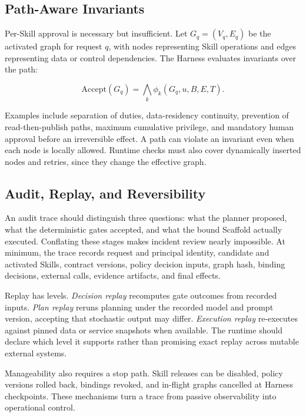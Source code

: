 \subsection{Path-Aware Invariants}

Per-Skill approval is necessary but insufficient. Let $G_q=(V_q,E_q)$ be the activated graph for request $q$, with nodes representing Skill operations and edges representing data or control dependencies. The Harness evaluates invariants over the path:

\begin{equation}
\mathrm{Accept}(G_q)=\bigwedge_k \phi_k(G_q,u,B,E,T).
\end{equation}

Examples include separation of duties, data-residency continuity, prevention of read-then-publish paths, maximum cumulative privilege, and mandatory human approval before an irreversible effect. A path can violate an invariant even when each node is locally allowed. Runtime checks must also cover dynamically inserted nodes and retries, since they change the effective graph.

\subsection{Audit, Replay, and Reversibility}

An audit trace should distinguish three questions: what the planner proposed, what the deterministic gates accepted, and what the bound Scaffold actually executed. Conflating these stages makes incident review nearly impossible. At minimum, the trace records request and principal identity, candidate and activated Skills, contract versions, policy decision inputs, graph hash, binding decisions, external calls, evidence artifacts, and final effects.

Replay has levels. \textit{Decision replay} recomputes gate outcomes from recorded inputs. \textit{Plan replay} reruns planning under the recorded model and prompt version, accepting that stochastic output may differ. \textit{Execution replay} re-executes against pinned data or service snapshots when available. The runtime should declare which level it supports rather than promising exact replay across mutable external systems.

Manageability also requires a stop path. Skill releases can be disabled, policy versions rolled back, bindings revoked, and in-flight graphs cancelled at Harness checkpoints. These mechanisms turn a trace from passive observability into operational control.

